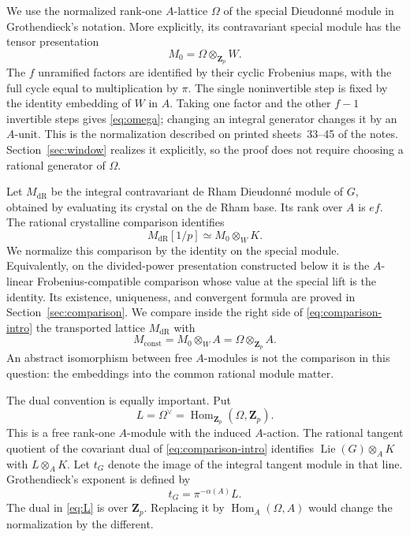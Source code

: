 \documentclass[11pt]{article}
\theoremstyle{definition}\newtheorem{definition}[theorem]{Definition}
\theoremstyle{remark}\newtheorem{remark}[theorem]{Remark}
\newcommand{\ZZ}{\mathbf Z}
\newcommand{\Hom}{\operatorname{Hom}}
\newcommand{\Lie}{\operatorname{Lie}}
\newcommand{\dR}{\mathrm{dR}}
\begin{document}
We use the normalized rank-one $A$-lattice $\Omega$ of the special Dieudonn\'e module in Grothendieck's notation. More explicitly, its contravariant special module has the tensor presentation
\begin{equation}\label{eq:omega}
 M_0=\Omega\otimes_{\ZZ_p}W.
\end{equation}
The $f$ unramified factors are identified by their cyclic Frobenius maps, with the full cycle equal to multiplication by $\pi$. The single noninvertible step is fixed by the identity embedding of $W$ in $A$. Taking one factor and the other $f-1$ invertible steps gives \eqref{eq:omega}; changing an integral generator changes it by an $A$-unit. This is the normalization described on printed sheets~33--45 of the notes. Section~\ref{sec:window} realizes it explicitly, so the proof does not require choosing a rational generator of $\Omega$.

Let $M_{\dR}$ be the integral contravariant de Rham Dieudonn\'e module of $G$, obtained by evaluating its crystal on the de Rham base. Its rank over $A$ is $ef$. The rational crystalline comparison identifies
\begin{equation}\label{eq:comparison-intro}
 M_{\dR}[1/p]\simeq M_0\otimes_W K.
\end{equation}
We normalize this comparison by the identity on the special module. Equivalently, on the divided-power presentation constructed below it is the $A$-linear Frobenius-compatible comparison whose value at the special lift is the identity. Its existence, uniqueness, and convergent formula are proved in Section~\ref{sec:comparison}. We compare inside the right side of \eqref{eq:comparison-intro} the transported lattice $M_{\dR}$ with
\begin{equation}\label{eq:constant-lattice}
 M_{\mathrm{const}}=M_0\otimes_W A
   =\Omega\otimes_{\ZZ_p}A.
\end{equation}
An abstract isomorphism between free $A$-modules is not the comparison in this question: the embeddings into the common rational module matter.

The dual convention is equally important. Put
\begin{equation}\label{eq:L}
 L=\Omega^\vee=\Hom_{\ZZ_p}(\Omega,\ZZ_p).
\end{equation}
This is a free rank-one $A$-module with the induced $A$-action. The rational tangent quotient of the covariant dual of \eqref{eq:comparison-intro} identifies $\Lie(G)\otimes_A K$ with $L\otimes_A K$. Let $t_G$ denote the image of the integral tangent module in that line. Grothendieck's exponent is defined by
\begin{equation}\label{eq:alpha}
 t_G=\pi^{-\alpha(A)}L.
\end{equation}
The dual in \eqref{eq:L} is over $\ZZ_p$. Replacing it by $\Hom_A(\Omega,A)$ would change the normalization by the different.
\end{document}
